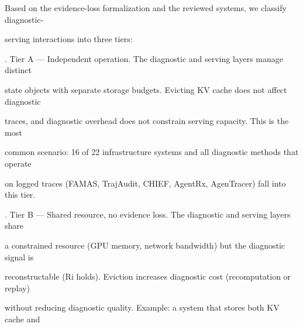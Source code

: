 \begin{flushleft}
\noindent Based on the evidence-loss formalization and the reviewed systems, we classify diagnostic-\par
\noindent serving interactions into three tiers:\par
{}. Tier A — Independent operation. The diagnostic and serving layers manage distinct\par
\noindent  state objects with separate storage budgets. Evicting KV cache does not affect diagnostic\par
\noindent  traces, and diagnostic overhead does not constrain serving capacity. This is the most\par
\noindent  common scenario: 16 of 22 infrastructure systems and all diagnostic methods that operate\par
\noindent  on logged traces (FAMAS, TrajAudit, CHIEF, AgentRx, AgenTracer) fall into this tier.\par
{}. Tier B — Shared resource, no evidence loss. The diagnostic and serving layers share\par
\noindent  a constrained resource (GPU memory, network bandwidth) but the diagnostic signal is\par
\noindent  reconstructable (Ri holds). Eviction increases diagnostic cost (recomputation or replay)\par
\noindent  without reducing diagnostic quality. Example: a system that stores both KV cache and\par
\end{flushleft}

